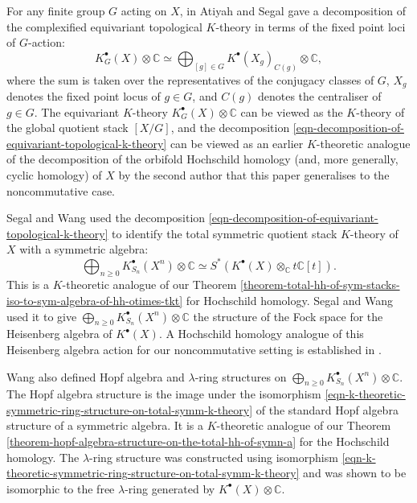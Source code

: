 \documentclass[12pt,a4paper,reqno]{amsart}
\begin{document}
For any finite group $G$ acting on $X$, in \cite[Theorem
2]{AtiyahSegal-OnEquivariantEulerCharacteristics} Atiyah and Segal
gave a decomposition of the complexified equivariant topological 
$K$-theory in terms of the fixed point loci of $G$-action: 
\begin{equation}
\label{eqn-decomposition-of-equivariant-topological-k-theory}
K_G^\bullet(X) \otimes \mathbb{C} \simeq \bigoplus_{[g] \in G}
K^\bullet(X_g)_{C(g)} \otimes \mathbb{C},
\end{equation}
where the sum is taken over the representatives of the conjugacy
classes of $G$, $X_g$ denotes the fixed point locus of $g \in G$, 
and $C(g)$ denotes the centraliser of $g \in G$. The equivariant
$K$-theory $K^\bullet_G(X) \otimes \mathbb{C}$ can be viewed as the $K$-theory
of the global quotient stack $[X/G]$, and the decomposition 
\eqref{eqn-decomposition-of-equivariant-topological-k-theory} can be
viewed as an earlier $K$-theoretic analogue of the decomposition 
of the orbifold Hochschild homology (and, more generally,
cyclic homology) of $X$ by the second author
\cite[Theorem 1.1]{Baranovsky-OrbifoldCohomologyAsPeriodicCyclicHomology}
that this paper generalises to the noncommutative case.

Segal \cite[Prop.~1.4]{Segal-EquivariantKTheoryAndSymmetricProducts}
and Wang \cite[Theorem
3]{Wang-EquivariantKTheoryWreathProductsAndHeisenbergAlgebra} used the
decomposition \eqref{eqn-decomposition-of-equivariant-topological-k-theory}
to identify the total symmetric quotient stack $K$-theory of $X$ with 
a symmetric algebra:
\begin{equation}
\label{eqn-k-theoretic-symmetric-ring-structure-on-total-symm-k-theory}
\bigoplus_{n \geq 0} K^\bullet_{S_n}(X^n) \otimes \mathbb{C}
\simeq 
S^* \left(K^\bullet(X) \otimes_\mathbb{C} t\mathbb{C}[t]\right). 
\end{equation}
This is a $K$-theoretic analogue of our Theorem 
\ref{theorem-total-hh-of-sym-stacks-iso-to-sym-algebra-of-hh-otimes-tkt}
for Hochschild homology. Segal and Wang used it to give 
$\bigoplus_{n \geq 0} K^\bullet_{S_n}(X^n) \otimes \mathbb{C}$
the structure of the Fock space for the Heisenberg algebra of $K^\bullet(X)$. 
A Hochschild homology analogue of this Heisenberg algebra
action for our noncommutative setting is established in
\cite{GyengeLogvinenko-TheHeisenbergAlgebraOfAVectorSpaceAndHochschildHomology}.  

Wang also defined Hopf algebra and $\lambda$-ring structures on  
$\bigoplus_{n \geq 0} K^\bullet_{S_n}(X^n) \otimes \mathbb{C}$. The Hopf
algebra structure 
\cite[\S2]{Wang-EquivariantKTheoryWreathProductsAndHeisenbergAlgebra}
is the image under the isomorphism 
\eqref{eqn-k-theoretic-symmetric-ring-structure-on-total-symm-k-theory}
of the standard Hopf algebra structure of a symmetric algebra. 
It is a $K$-theoretic analogue of
our Theorem \ref{theorem-hopf-algebra-structure-on-the-total-hh-of-symn-a}
for the Hochschild homology. 
The $\lambda$-ring structure 
\cite[\S3]{Wang-EquivariantKTheoryWreathProductsAndHeisenbergAlgebra}
was constructed using isomorphism 
\eqref{eqn-k-theoretic-symmetric-ring-structure-on-total-symm-k-theory}
and was shown to be isomorphic to the free $\lambda$-ring generated by
$K^\bullet(X) \otimes \mathbb{C}$. 
\end{document}
